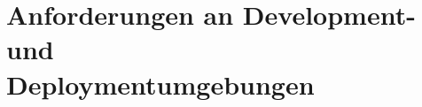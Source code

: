 \chapter[Anforderungen an Development- und Deploymentumgebungen]{Anforderungen an Development- und \\Deploymentumgebungen}
\label{ch:04_requirements-for-development-and-deployment-environments}




